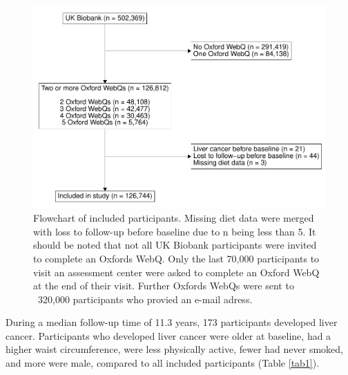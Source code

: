 \documentclass[sn-basic,Numbered,iicol,pdflatex]{sn-jnl}
\begin{document}
\begin{figure}[h]
\includegraphics[width=1\linewidth,]{fig1-1} \caption{Flowchart of included participants. Missing diet data were merged with loss to follow-up before baseline due to n being less than 5. It should be noted that not all UK Biobank participants were invited to complete an Oxfords WebQ. Only the last 70,000 participants to visit an assessment center were asked to complete an Oxford WebQ at the end of their visit. Further Oxfords WebQs were sent to ~320,000 participants who provied an e-mail adress.}\label{fig:fig1}
\end{figure}

During a median follow-up time of 11.3 years, 173 participants developed
liver cancer. Participants who developed liver cancer were older at
baseline, had a higher waist circumference, were less physically active,
fewer had never smoked, and more were male, compared to all included
participants (Table \ref{tab1}).
\end{document}
